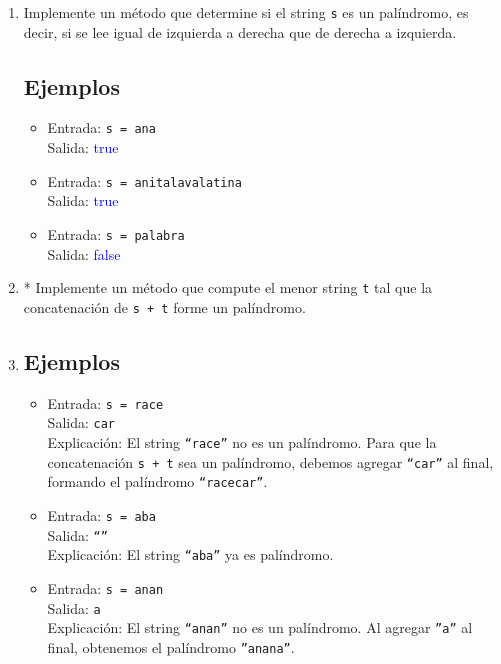 \begin{enumerate}[label=\alph*)]
    \item Implemente un método que determine si el string \texttt{s} es un palíndromo, es decir, si se lee igual de izquierda a derecha que de derecha a izquierda.
    
    \subsection*{Ejemplos}
    \begin{itemize}
        \item Entrada: \texttt{s = ana}\\
        Salida: \textcolor{blue}{true}

        \item Entrada: \texttt{s = anitalavalatina}\\
        Salida: \textcolor{blue}{true}

        \item Entrada: \texttt{s = palabra}\\
        Salida: \textcolor{blue}{false}
    \end{itemize}

    \item * Implemente un método que compute el menor string \texttt{t} tal que la concatenación de \texttt{s + t} forme un palíndromo.
    
    \item \subsection*{Ejemplos}
    \begin{itemize}
        \item Entrada: \texttt{s = race}\\
        Salida: \texttt{car}\\
        Explicación: El string \texttt{``race''} no es un palíndromo. Para que la concatenación \texttt{s + t} sea un palíndromo, debemos agregar \texttt{``car''} al final, formando el palíndromo \texttt{``racecar''}.

        \item Entrada: \texttt{s = aba}\\
        Salida: \texttt{``''}\\
        Explicación: El string \texttt{``aba''} ya es palíndromo.

        \item Entrada: \texttt{s = anan}\\
        Salida: \texttt{a}\\
        Explicación: El string \texttt{``anan''} no es un palíndromo. Al agregar \texttt{''a''} al final, obtenemos el palíndromo \texttt{''anana''}.
    \end{itemize}
\end{enumerate}
